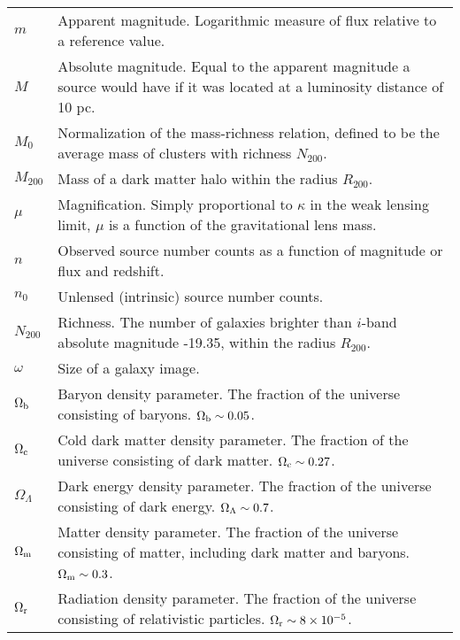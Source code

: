 \begin{tabular}{p{0.6in}p{5.8in}}
$m$ & Apparent magnitude. Logarithmic measure of flux relative to a reference value. \\
$M$ & Absolute magnitude. Equal to the apparent magnitude a source would have if it was located at a luminosity distance of 10 pc. \\
$M_0$ & Normalization of the mass-richness relation, defined to be the average mass of clusters with richness $N_{200}$. \\
$M_{200}$ & Mass of a dark matter halo within the radius $R_{200}$. \\
$\mu$ & Magnification. Simply proportional to $\kappa$ in the weak lensing limit, $\mu$ is a function of the gravitational lens mass. \\
$n$ & Observed source number counts as a function of magnitude or flux and redshift. \\
$n_0$ & Unlensed (intrinsic) source number counts. \\
$N_{200}$ & Richness. The number of galaxies brighter than $i$-band absolute magnitude -19.35, within the radius $R_{200}$. \\
$\omega$ & Size of a galaxy image. \\
$\Omega_{\rm b}$ & Baryon density parameter. The fraction of the universe consisting of baryons. $\Omega_{\rm b} \sim 0.05$. \\
$\Omega_{\rm c}$ & Cold dark matter density parameter. The fraction of the universe consisting of dark matter. $\Omega_{\rm c} \sim 0.27$. \\
$\Omega_{\Lambda}$ & Dark energy density parameter. The fraction of the universe consisting of dark energy. $\Omega_{\rm \Lambda} \sim 0.7$. \\
$\Omega_{\rm m}$ & Matter density parameter. The fraction of the universe consisting of matter, including dark matter and baryons. $\Omega_{\rm m} \sim 0.3$. \\
$\Omega_{\rm r}$ & Radiation density parameter. The fraction of the universe consisting of relativistic particles. $\Omega_{\rm r} \sim 8 \times 10^{-5}$. \\

\end{tabular}
